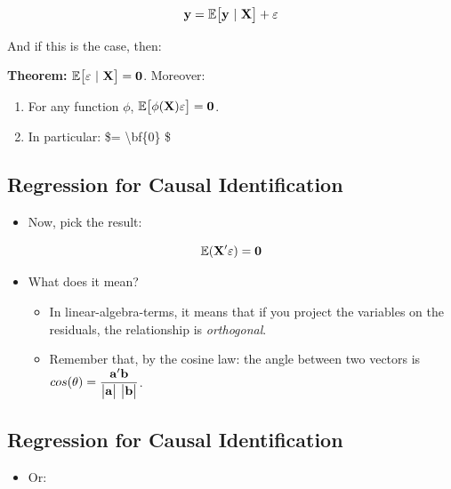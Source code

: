 \documentclass[11pt]{article}
\providecommand{\tightlist}{%
      \setlength{\itemsep}{0pt}\setlength{\parskip}{0pt}}
\begin{document}
\[ \bf{y} = \mathbb{E}\big[\bf{y} \ | \ \bf{X}\big] + \bf{\varepsilon} \]

And if this is the case, then:

\textbf{Theorem:}
\(\mathbb{E}\big[\bf{\varepsilon} \ | \ \bf{X} \big] = \bf{0}\).
Moreover:

\begin{enumerate}
\def\labelenumi{\arabic{enumi}.}
\item
  For any function \(\phi\),
  \(\mathbb{E}\big[\phi(\bf{X})\bf{\varepsilon} \big] = \bf{0}\).
\item
  In particular: \$ =
  \textbackslash bf\{0\} \$
\end{enumerate}

    \hypertarget{regression-for-causal-identification}{%
\subsection{Regression for Causal
Identification}\label{regression-for-causal-identification}}

\begin{itemize}
\tightlist
\item
  Now, pick the result:
\end{itemize}

\[\mathbb{E}(\bf{X}'\varepsilon) = 0\]

\begin{itemize}
\tightlist
\item
  What does it mean?

  \begin{itemize}
  \tightlist
  \item
    In linear-algebra-terms, it means that if you project the variables
    on the residuals, the relationship is \emph{orthogonal}.
  \item
    Remember that, by the cosine law: the angle between two vectors is
    \(cos(\theta) = \dfrac{\bf{a}'\bf{b}}{\big|\bf{a}\big| \ \big|\bf{b}\big|}\).
  \end{itemize}
\end{itemize}

    \hypertarget{regression-for-causal-identification}{%
\subsection{Regression for Causal
Identification}\label{regression-for-causal-identification}}

\begin{itemize}
\tightlist
\item
  Or:
\end{itemize}
\end{document}
